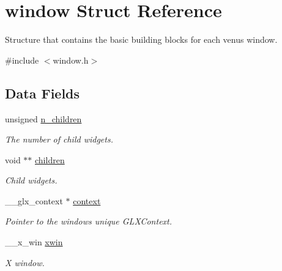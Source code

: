 \hypertarget{structwindow}{}\section{window Struct Reference}
\label{structwindow}


Structure that contains the basic building blocks for each venus window.  




{\ttfamily \#include $<$window.\+h$>$}

\subsection*{Data Fields}
\begin{DoxyCompactItemize}
\item 
\mbox{\label{structwindow_a9dcdf1cf06c0e60a6c897d1dad4e1db6}} 
unsigned \hyperlink{structwindow_a9dcdf1cf06c0e60a6c897d1dad4e1db6}{n\+\_\+children}
\begin{DoxyCompactList}\small\item\em The number of child widgets. \end{DoxyCompactList}\item 
\mbox{\label{structwindow_a2eb202df09af540b9848de2661eec826}} 
void $\ast$$\ast$ \hyperlink{structwindow_a2eb202df09af540b9848de2661eec826}{children}
\begin{DoxyCompactList}\small\item\em Child widgets. \end{DoxyCompactList}\item 
\mbox{\label{structwindow_a90eff798620fee3c37913a2a50f1c2a8}} 
\+\_\+\+\_\+glx\+\_\+context $\ast$ \hyperlink{structwindow_a90eff798620fee3c37913a2a50f1c2a8}{context}
\begin{DoxyCompactList}\small\item\em Pointer to the window\textquotesingle{}s unique G\+L\+X\+Context. \end{DoxyCompactList}\item 
\mbox{\label{structwindow_a23ff6e8e3c92fbe719eac958c837303d}} 
\+\_\+\+\_\+x\+\_\+win \hyperlink{structwindow_a23ff6e8e3c92fbe719eac958c837303d}{xwin}
\begin{DoxyCompactList}\small\item\em X window. \end{DoxyCompactList}\end{DoxyCompactItemize}


